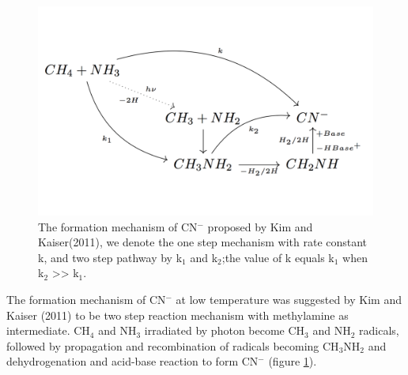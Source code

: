 \begin{figure}
\centering
\includegraphics[width=\textwidth]{figures/chapter3/CNmechanism}
\caption{The formation mechanism of CN$^-$ proposed by Kim and Kaiser(2011)\cite{kim}, we denote the one step mechanism with rate constant k, and two step pathway by k$_1$ and k$_2$;the value of k equals k$_1$ when k$_2$ >> k$_1$.}
\label{fig:CNmechanism}
\end{figure}

The formation mechanism of CN$^-$ at low temperature was suggested by Kim and Kaiser (2011) to be two step reaction mechanism with methylamine as intermediate\cite{kim}. CH$_4$ and NH$_3$ irradiated by photon become CH$_3$ and NH$_2$ radicals, followed by propagation and recombination of radicals becoming CH$_3$NH$_2$ and dehydrogenation and acid-base reaction to form CN$^-$ (figure \ref{fig:CNmechanism}).


